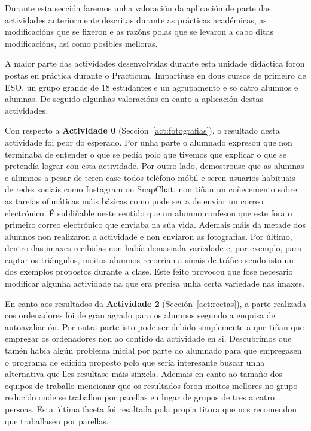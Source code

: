 Durante esta sección faremos unha valoración da aplicación de parte das actividades anteriormente descritas durante as prácticas académicas, as modificacións que se fixeron e as razóns polas que se levaron a cabo ditas modificacións, así como posibles melloras.

A maior parte das actividades desenvolvidas durante esta unidade didáctica foron postas en práctica durante o Practicum. Impartiuse en dous cursos de primeiro de ESO, un grupo grande de 18 estudantes e un agrupamento e so catro alumnos e alumnas. De seguido algunhas valoracións en canto a aplicación destas actividades.

Con respecto a \textbf{Actividade 0} (Sección~\ref{act:fotografias}), o resultado desta actividade foi peor do esperado. Por unha parte o alumnado expresou que non terminaba de entender o que se pedía polo que tivemos que explicar o que se pretendía lograr con esta actividade. Por outro lado, demostrouse que as alumnas e alumnos a pesar de teren case todos teléfono móbil e seren usuarios habituais de redes sociais como Instagram ou SnapChat, non tiñan un coñecemento sobre as tarefas ofimáticas máis básicas como pode ser a de enviar un correo electrónico. É subliñable neste sentido que un alumno confesou que este fora o primeiro correo electrónico que enviaba na súa vida. Ademais máis da metade dos alumnos non realizaron a actividade e non enviaron as fotografías. Por último, dentro das imaxes recibidas non había demasiada variedade e, por exemplo, para captar os triángulos, moitos alumnos recorrían a sinais de tráfico sendo isto un dos exemplos propostos durante a clase. Este feito provocou que fose necesario modificar algunha actividade na que era precisa unha certa variedade nas imaxes.

En canto aos resultados da \textbf{Actividade 2} (Sección~\ref{act:rectas}), a parte realizada cos ordenadores foi de gran agrado para os alumnos segundo a enquisa de autoavaliación. Por outra parte isto pode ser debido simplemente a que tiñan que empregar os ordenadores non ao contido da actividade en si. Descubrimos que tamén había algún problema inicial por parte do alumnado para que empregasen o programa de edición proposto polo que sería interesante buscar unha alternativa que lles resultase máis sinxela. Ademais en canto ao tamaño dos equipos de traballo mencionar que os resultados foron moitos mellores no grupo reducido onde se traballou por parellas en lugar de grupos de tres a catro persoas. Esta última faceta foi resaltada pola propia titora que nos recomendou que traballasen por parellas.


